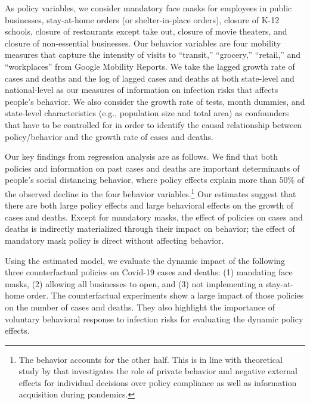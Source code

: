 \documentclass[11pt,reqno,letter]{amsart}
\theoremstyle{definition}
\begin{document}
As policy variables, we consider  mandatory face masks for employees in public businesses, stay-at-home orders (or shelter-in-place orders), closure of K-12 schools, closure of restaurants except take out, closure of movie theaters, and closure of non-essential businesses. Our behavior variables are four mobility measures that capture the intensity of visits to ``transit,'' ``grocery,'' ``retail,'' and ``workplaces''  from Google Mobility Reports. We take the lagged growth rate of cases and deaths and the log of lagged cases and deaths at both state-level and national-level as our measures of information on infection risks that affects people's  behavior. We also consider the growth rate of tests, month dummies, and state-level characteristics (e.g., population size and total area) as confounders that have to be controlled for in order to identify the causal relationship between policy/behavior and the growth rate of cases and deaths.

Our key findings from regression analysis are as follows.  We find
that both policies and information on past cases and deaths are important
determinants of people's social distancing behavior, where policy
effects explain more than $50\%$ of the observed decline in the four
behavior variables.\footnote{The behavior accounts for the other half. This is in line with theoretical study by \cite{gitmez2020} that investigates the role of private behavior and
negative external effects for individual decisions over policy compliance as well as information acquisition during pandemics.} Our estimates suggest that there are both large policy effects and large behavioral effects on the growth of cases and deaths. Except for mandatory masks, the effect of policies on cases and deaths is indirectly materialized through their impact on behavior; the effect of mandatory mask policy is direct without affecting behavior.


Using the estimated model, we evaluate the dynamic impact of the following three counterfactual policies on Covid-19 cases and deaths: (1) mandating face masks, (2)  allowing all businesses to open, and (3) not implementing a stay-at-home order.  The counterfactual experiments show a large impact of  those policies on  the number of cases and deaths.  They also highlight the importance of voluntary behavioral response to infection risks for evaluating the dynamic policy effects.
\end{document}
